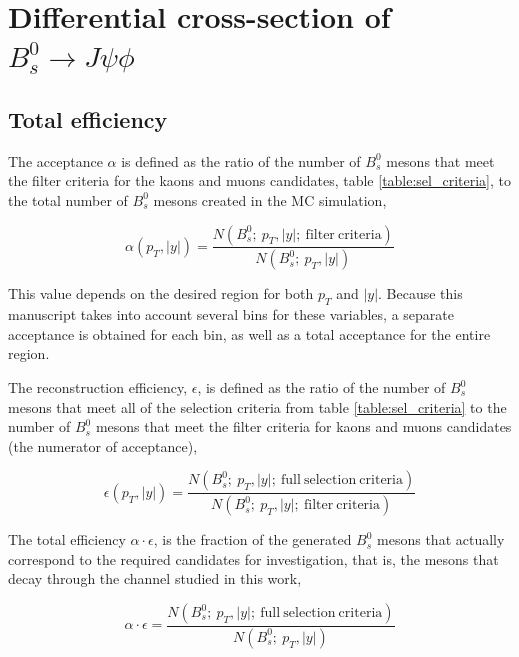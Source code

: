 \chapter[\leavevmode\newline Differential cross-section of $B^0_s \to J\psi \phi$]{Differential cross-section of $B^0_s \to J\psi \phi$}
\label{chap:Chapter_5}

\section{Total efficiency}

The acceptance $\alpha$ is defined as the ratio of the number of $B^0_s$ mesons that meet the filter criteria for the kaons and muons candidates, table \ref{table:sel_criteria}, to the total number of $B^0_s$ mesons created in the MC simulation,

\begin{equation}
\alpha(p_T, |y|) = \frac{N(B^0_s; \ p_T, |y| ; \ \mathrm{filter \ criteria})}{N(B^0_s; \ p_T, |y| )}
\end{equation}

This value depends on the desired region for both $p_T$ and $|y|$. Because this manuscript takes into account several bins for these variables, a separate acceptance is obtained for each bin, as well as a total acceptance for the entire region. 

The reconstruction efficiency, $\epsilon$, is defined as the ratio of the number of $B^0_s$ mesons that meet all of the selection criteria from table \ref{table:sel_criteria} to the number of $B^0_s$ mesons that meet the filter criteria for kaons and muons candidates (the numerator of acceptance),

\begin{equation}
	\epsilon(p_T, |y|) = \frac{N(B^0_s; \ p_T, |y| ; \ \mathrm{full \ selection \ criteria})}{N(B^0_s; \ p_T, |y| ; \ \mathrm{filter \ criteria})}
\end{equation}

The total efficiency $\alpha \cdot \epsilon$, is the fraction of the generated $B^0_s$ mesons that actually correspond to the required candidates for investigation, that is, the mesons that decay through the channel studied in this work,

\begin{equation}
	\alpha \cdot \epsilon = \frac{N(B^0_s; \ p_T, |y| ; \ \mathrm{full \ selection \ criteria})}{N(B^0_s; \ p_T, |y|)}
\end{equation}

